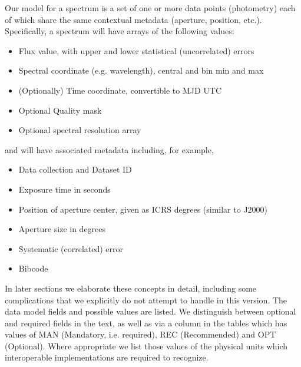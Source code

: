 \documentclass[11pt]{article}
\begin{document}
Our model for a spectrum is a set of one or more data points (photometry)  each of
which share the same contextual metadata  (aperture, position,
etc.). Specifically, a spectrum
will have arrays of the following values:

\vskip 0.1in

\colorbox{ipink}{
\begin{minipage}{0.9\textwidth}

\begin{itemize}
\item Flux value, with upper and lower statistical (uncorrelated) errors 
\item Spectral coordinate  (e.g. wavelength), central and bin min and max 
\item (Optionally) Time coordinate, convertible to MJD UTC
\item Optional Quality mask
\item Optional spectral resolution array
\end{itemize}
\end{minipage}
}

\vskip 0.1in

and will have associated metadata including, for example,

\vskip 0.1in

\colorbox{ipink}{
\begin{minipage}{0.9\textwidth}
\begin{itemize}
\item Data collection and Dataset ID
\item Exposure time in seconds
\item Position of aperture center, given as ICRS degrees
(similar to J2000)
\item Aperture size in degrees
\item Systematic (correlated) error
\item Bibcode
\end{itemize}
\end{minipage}
}

\vskip 0.1in

In later sections we elaborate these concepts in detail, including some
complications that we explicitly do not attempt to handle in this
version.
The data model fields and possible values
are listed. We distinguish between optional and required fields in the
text, as well as via a 
column in the tables which has values of MAN (Mandatory, i.e. required),
REC (Recommended) and OPT (Optional).
Where appropriate we list those values of the physical units which interoperable
implementations are required to recognize.
\end{document}
